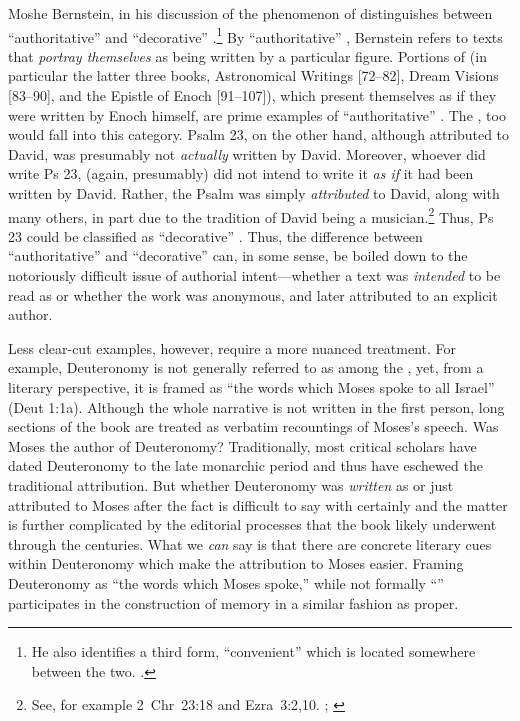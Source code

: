 Moshe Bernstein, in his discussion of the phenomenon of \psy distinguishes between ``authoritative'' \psy and ``decorative'' \psy.\footnote{He also identifies a third form, ``convenient'' \psy which is located somewhere between the two. \cite[3--7]{bernstein_chazon-etal1999}.} By ``authoritative'' \psy, Bernstein refers to texts that \emph{portray themselves} as being written by a particular figure. Portions of \firstenoch (in particular the latter three books, Astronomical Writings [72--82], Dream Visions [83--90], and the Epistle of Enoch [91--107]), which present themselves as if they were written by Enoch himself, are prime examples of ``authoritative'' \psy. The \ga, too would fall into this category. Psalm 23, on the other hand, although attributed to David, was presumably not \emph{actually} written by David. Moreover, whoever did write Ps 23, (again, presumably) did not intend to write it \emph{as if} it had been written by David. Rather, the Psalm was simply \emph{attributed} to David, along with many others, in part due to the tradition of David being a musician.\footnote{See, for example 2~Chr~23:18 and Ezra~3:2,10. \cite{mays_interpretation1986}; \cite{sarna_stein-loewe1979}} Thus, Ps 23 could be classified as ``decorative'' \psy. Thus, the difference between ``authoritative'' and ``decorative'' \psy can, in some sense, be boiled down to the notoriously difficult issue of authorial intent---whether a text was \emph{intended} to be read as \psa or whether the work was anonymous, and later attributed to an explicit author.

Less clear-cut examples, however, require a more nuanced treatment. For example, Deuteronomy is not generally referred to as among the \psa, yet, from a literary perspective, it is framed as  ``the words which Moses spoke to all Israel'' (Deut 1:1a). Although the whole narrative is not written in the first person, long sections of the book are treated as verbatim recountings of Moses's speech. Was Moses the author of Deuteronomy? Traditionally, most critical scholars have dated Deuteronomy to the late monarchic period and thus have eschewed the traditional attribution. But whether Deuteronomy was \emph{written} as \psa or just attributed to Moses after the fact is difficult to say with certainly and the matter is further complicated by the editorial processes that the book likely underwent through the centuries.\autocite[143--172]{toorn2007} What we \emph{can} say is that there are concrete literary cues within Deuteronomy which make the attribution to Moses easier. Framing Deuteronomy as ``the words which Moses spoke,'' while not formally ``\psa'' participates in the construction of memory in a similar fashion as \psa proper.

